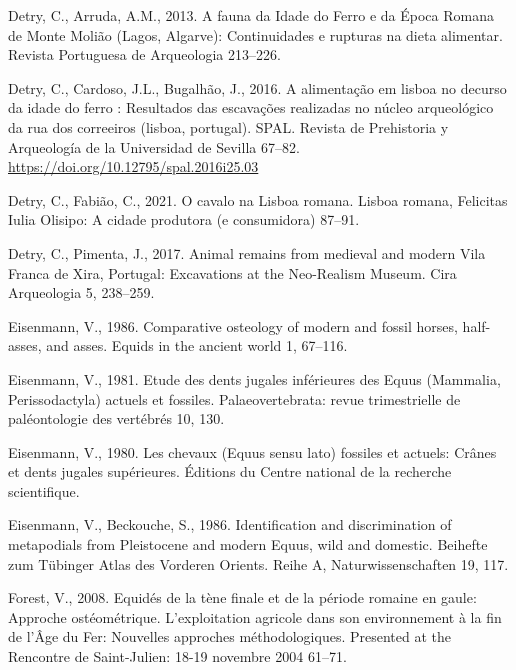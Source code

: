 \documentclass[preprint, 3p, authoryear]{elsarticle} %
\newlength{\cslhangindent}
\newlength{\cslentryspacingunit} %
\newenvironment{CSLReferences}[2] %
 {%
  \setlength{\parindent}{0pt}
  \ifodd #1
  \let\oldpar\par
  \def\par{\hangindent=\cslhangindent\oldpar}
  \fi
  \setlength{\parskip}{#2\cslentryspacingunit}
 }%
 {}
\begin{document}
\begin{CSLReferences}{1}{0}
\leavevmode{}%
Detry, C., Arruda, A.M., 2013. A fauna da {Idade} do {Ferro} e da {Época Romana} de {Monte Molião} ({Lagos}, {Algarve}): Continuidades e rupturas na dieta alimentar. Revista Portuguesa de Arqueologia 213--226.

\leavevmode{}%
Detry, C., Cardoso, J.L., Bugalhão, J., 2016. A alimentação em lisboa no decurso da idade do ferro : Resultados das escavações realizadas no núcleo arqueológico da rua dos correeiros (lisboa, portugal). SPAL. Revista de Prehistoria y Arqueología de la Universidad de Sevilla 67--82. \url{https://doi.org/10.12795/spal.2016i25.03}

\leavevmode{}%
Detry, C., Fabião, C., 2021. O cavalo na {Lisboa} romana. Lisboa romana, Felicitas Iulia Olisipo: A cidade produtora (e consumidora) 87--91.

\leavevmode{}%
Detry, C., Pimenta, J., 2017. Animal remains from medieval and modern {Vila Franca} de {Xira}, {Portugal}: {Excavations} at the {Neo-Realism Museum}. Cira Arqueologia 5, 238--259.

\leavevmode{}%
Eisenmann, V., 1986. Comparative osteology of modern and fossil horses, half-asses, and asses. Equids in the ancient world 1, 67--116.

\leavevmode{}%
Eisenmann, V., 1981. Etude des dents jugales inférieures des {Equus} ({Mammalia}, {Perissodactyla}) actuels et fossiles. Palaeovertebrata: revue trimestrielle de paléontologie des vertébrés 10, 130.

\leavevmode{}%
Eisenmann, V., 1980. Les chevaux ({Equus} sensu lato) fossiles et actuels: Crânes et dents jugales supérieures. {Éditions du Centre national de la recherche scientifique}.

\leavevmode{}%
Eisenmann, V., Beckouche, S., 1986. Identification and discrimination of metapodials from {Pleistocene} and modern {Equus}, wild and domestic. Beihefte zum Tübinger Atlas des Vorderen Orients. Reihe A, Naturwissenschaften 19, 117.

\leavevmode{}%
Forest, V., 2008. Equidés de la tène finale et de la période romaine en gaule: Approche ostéométrique. L'exploitation agricole dans son environnement à la fin de l'Âge du Fer: Nouvelles approches méthodologiques. Presented at the Rencontre de Saint-Julien: 18-19 novembre 2004 61--71.


\end{CSLReferences}
\end{document}
